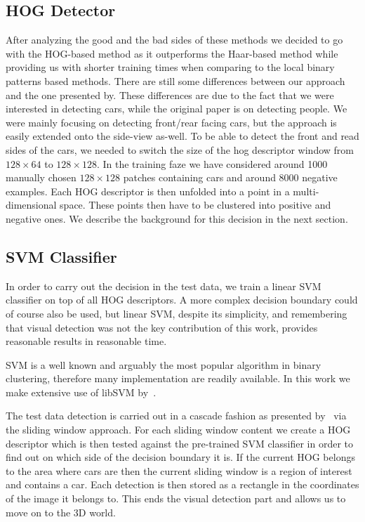     \subsection{HOG Detector}\label{sub:hog_detector}
        After analyzing the good and the bad sides of these methods we decided to go with the HOG-based method as it outperforms the Haar-based method while providing us with shorter training times when comparing to the local binary patterns based methods.
        There are still some differences between our approach and the one presented by\cite{dalal2005}. These differences are due to the fact that we were interested in detecting cars, while the original paper is on detecting people.
        We were mainly focusing on detecting front/rear facing cars, but the approach is easily extended onto the side-view as-well.
        To be able to detect the front and read sides of the cars, we needed to switch the size of the hog descriptor window from $128 \times 64$ to $128 \times 128$.
        In the training faze we have considered around 1000 manually chosen $128 \times 128$ patches containing cars and around 8000 negative examples. Each HOG descriptor is then unfolded into a point in a multi-dimensional space. These points then have to be clustered into positive and negative ones. We describe the background for this decision in the next section.

    \subsection{SVM Classifier}\label{sub:svm_classifier}

        In order to carry out the decision in the test data, we train a linear SVM classifier on top of all HOG descriptors.
        A more complex decision boundary could of course also be used, but linear SVM, despite its simplicity, and remembering that visual detection was not the key contribution of this work, provides reasonable results in reasonable time.

        SVM is a well known and arguably the most popular algorithm in binary clustering, therefore many implementation are readily available. In this work we make extensive use of libSVM by~\cite{libSVM2011}.

        The test data detection is carried out in a cascade fashion as presented by~\cite{violajones2001} via the sliding window approach. For each sliding window content we create a HOG descriptor which is then tested against the pre-trained SVM classifier in order to find out on which side of the decision boundary it is. If the current HOG belongs to the area where cars are then the current sliding window is a region of interest and contains a car.
        Each detection is then stored as a rectangle in the coordinates of the image it belongs to.
        This ends the visual detection part and allows us to move on to the 3D world.

